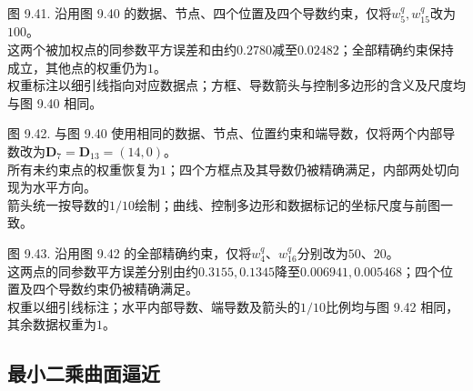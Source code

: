 \documentclass[../main.tex]{subfiles}
\begin{document}
\begin{center}
\begin{minipage}{27cm}
\vspace*{.6\baselineskip}
\centering
{}
\par\smallskip
图 9.41. 沿用图 9.40 的数据、节点、四个位置及四个导数约束，仅将$w_5^q,w_{15}^q$改为$100$。\\
这两个被加权点的同参数平方误差和由约$0.2780$减至$0.02482$；全部精确约束保持成立，其他点的权重仍为$1$。\\
权重标注以细引线指向对应数据点；方框、导数箭头与控制多边形的含义及尺度均与图 9.40 相同。
\end{minipage}
\end{center}

\begin{center}
\begin{minipage}{27cm}
\vspace*{.6\baselineskip}
\centering
{}
\par\smallskip
图 9.42. 与图 9.40 使用相同的数据、节点、位置约束和端导数，仅将两个内部导数改为$\mathbf D_7=\mathbf D_{13}=(14,0)$。\\
所有未约束点的权重恢复为$1$；四个方框点及其导数仍被精确满足，内部两处切向现为水平方向。\\
箭头统一按导数的$1/10$绘制；曲线、控制多边形和数据标记的坐标尺度与前图一致。
\end{minipage}
\end{center}

\begin{center}
\begin{minipage}{27cm}
\vspace*{.6\baselineskip}
\centering
{}
\par\smallskip
图 9.43. 沿用图 9.42 的全部精确约束，仅将$w_4^q$、$w_{16}^q$分别改为$50$、$20$。\\
这两点的同参数平方误差分别由约$0.3155,0.1345$降至$0.006941,0.005468$；四个位置及四个导数约束仍被精确满足。\\
权重以细引线标注；水平内部导数、端导数及箭头的$1/10$比例均与图 9.42 相同，其余数据权重为$1$。
\end{minipage}
\end{center}

\subsection{最小二乘曲面逼近}
\end{document}
